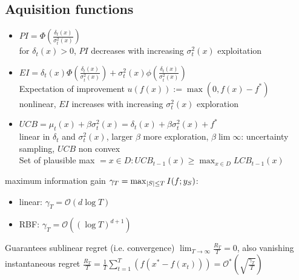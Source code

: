 \subsection{Aquisition functions}
\begin{itemize}
    \item $PI = \Phi(\frac{\delta_{t}(x)}{\sigma_{t}^{2}(x)})$\\
    for $\delta_{t}(x) >0$, $PI$ decreases with increasing $\sigma_{t}^{2}(x)$ \textrightarrow exploitation
    \item $EI = \delta_{t}(x)\Phi(\frac{\delta_{t}(x)}{\sigma_{t}^{2}(x)}) +
    \sigma_{t}^{2}(x) \phi(\frac{\delta_{t}(x)}{\sigma_{t}^{2}(x)})$\\
    Expectation of improvement $u(f(x)):= \max(0, f(x)-f^{*})$\\
    nonlinear, $EI$ increases with increasing $\sigma_{t}^{2}(x)$ \textrightarrow exploration
    \item $UCB = \mu_{t}(x) + \beta \sigma_{t}^{2}(x) = \delta_{t}(x) + \beta \sigma_{t}^{2}(x) + f^{*}$\\
    linear in $\delta_{t}$ and $\sigma_{t}^{2}(x)$, larger $\beta$ \textrightarrow more exploration,
    $\beta \lim \infty$: uncertainty sampling, $UCB$ non convex\\
    Set of plausible max $={x \in D: UCB_{t-1}(x) \geq \max_{x \in D} LCB_{t-1}(x)}$
\end{itemize}

maximum information gain $\gamma_{T} = \max_{\left\lvert S\right\rvert \leq T} I(f;y_{S})$:
\begin{itemize}
    \item linear: $\gamma_{T} = \mathcal{O}(d \log T)$
    \item RBF: $\gamma_{T} = \mathcal{O}((\log T)^{d+1})$
\end{itemize}
Guarantees sublinear regret (i.e. convergence) \textrightarrow $\lim_{T \rightarrow \infty} \frac{R_{T}}{T} =0$,
also vanishing instantaneous regret
$\frac{R_{T}}{T} = \frac{1}{T}\sum_{t=1}^{T}(f(x^{*}-f(x_{t}))) = \mathcal{O}^{*}(\sqrt {\frac{\gamma_{T}}{T}})$


